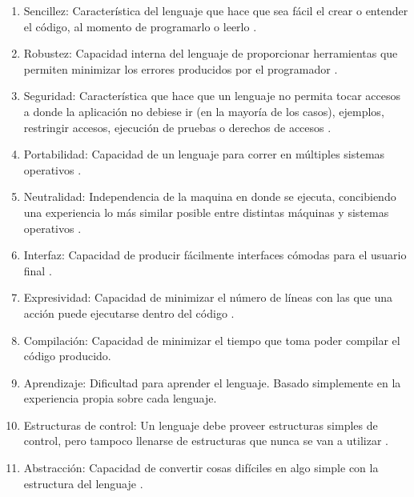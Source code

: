 \documentclass[a4paper,12pt,openany,oneside]{book}
\begin{document}
\begin{enumerate}

\item Sencillez: Característica del lenguaje que hace que sea fácil el crear o entender el código, al momento de programarlo o leerlo \cite{data4}.

\item Robustez: Capacidad interna del lenguaje de proporcionar herramientas que permiten minimizar los errores producidos por el programador \cite{data4}.

\item Seguridad: Característica que hace que un lenguaje no permita tocar accesos a donde la aplicación no debiese ir (en la mayoría de los casos), ejemplos, restringir accesos, ejecución de pruebas o derechos de accesos \cite{data4}.

\item Portabilidad: Capacidad de un lenguaje para correr en múltiples sistemas operativos \cite{data4}.

\item Neutralidad: Independencia de la maquina en donde se ejecuta, concibiendo una experiencia lo más similar posible entre distintas máquinas y sistemas operativos \cite{data4}.

\item Interfaz: Capacidad de producir fácilmente interfaces cómodas para el usuario final \cite{data4}.

\item Expresividad: Capacidad de minimizar el número de líneas con las que una acción puede ejecutarse dentro del código \cite{data5}.

\item Compilación: Capacidad de minimizar el tiempo que toma poder compilar el código producido.

\item Aprendizaje: Dificultad para aprender el lenguaje. Basado simplemente en la experiencia propia sobre cada lenguaje.

\item Estructuras de control: Un lenguaje debe proveer estructuras simples de control, pero tampoco llenarse de estructuras que nunca se van a utilizar \cite{data6}.

\item Abstracción: Capacidad de convertir cosas difíciles en algo simple con la estructura del lenguaje \cite{data6}.

\end{enumerate}
\end{document}

